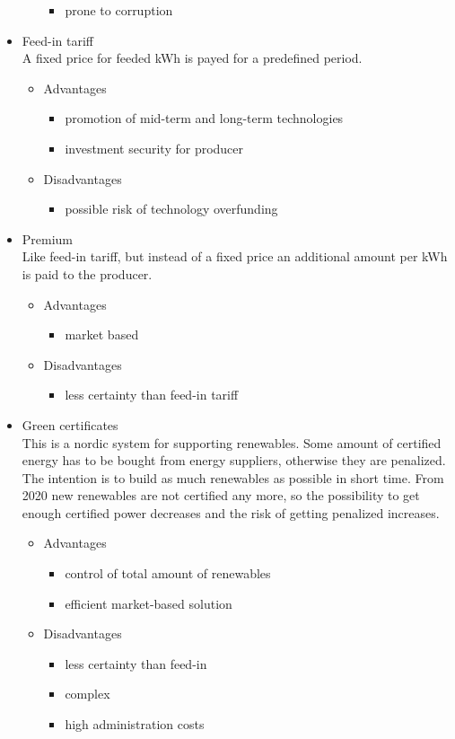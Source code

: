 \documentclass{article}
\begin{document}
\begin{itemize}
\begin{itemize}
\begin{itemize}
\item prone to corruption
\end{itemize}
\end{itemize}
\item Feed-in tariff\\
A fixed price for feeded kWh is payed for a predefined period.
\begin{itemize}
\item Advantages
\begin{itemize}
\item promotion of mid-term and long-term technologies
\item investment security for producer
\end{itemize}
\item Disadvantages
\begin{itemize}
\item possible risk of technology overfunding
\end{itemize}
\end{itemize}
\item Premium\\
Like feed-in tariff, but instead of a fixed price an additional amount per kWh is paid to the producer.
\begin{itemize}
\item Advantages
\begin{itemize}
\item market based
\end{itemize}
\item Disadvantages
\begin{itemize}
\item less certainty than feed-in tariff
\end{itemize}
\end{itemize}
\item Green certificates\\
This is a nordic system for supporting renewables. Some amount of certified energy has to be bought from energy suppliers, otherwise they are penalized. The intention is to build as much renewables as possible in short time. From 2020 new renewables are not certified any more, so the possibility to get enough certified power decreases and the risk of getting penalized increases.
\begin{itemize}
\item Advantages
\begin{itemize}
\item control of total amount of renewables
\item efficient market-based solution
\end{itemize}
\item Disadvantages
\begin{itemize}
\item less certainty than feed-in
\item complex
\item high administration costs
\end{itemize}
\end{itemize}
\end{itemize}
\end{document}
